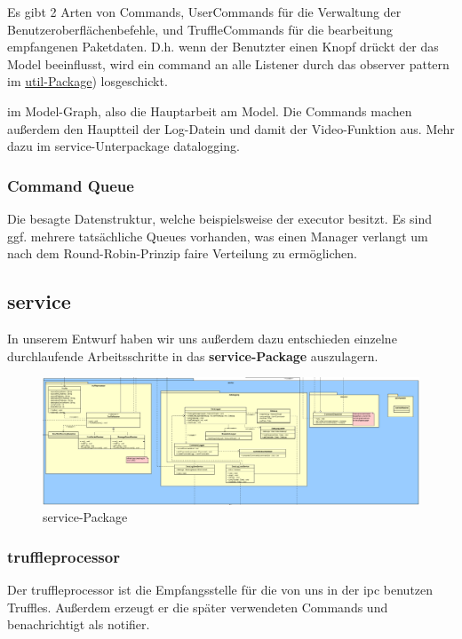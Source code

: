 Es gibt 2 Arten von Commands, UserCommands für die Verwaltung der
Benutzeroberflächenbefehle, und TruffleCommands für die bearbeitung empfangenen
Paketdaten. D.h. wenn der Benutzter einen Knopf drückt der das Model beeinflusst,
wird ein command an alle Listener durch das observer pattern im \hyperref[subsec:util]{util-Package})
losgeschickt.
\newline
\newline

im
Model-Graph, also die Hauptarbeit am Model. Die Commands machen außerdem den
Hauptteil der Log-Datein und damit der Video-Funktion aus. Mehr dazu im
service-Unterpackage datalogging.

    \subsubsection{Command Queue}
    Die besagte Datenstruktur, welche beispielsweise der executor besitzt. Es
    sind ggf. mehrere tatsächliche Queues vorhanden, was einen Manager verlangt
    um nach dem Round-Robin-Prinzip faire Verteilung zu ermöglichen.


\subsection{service}


In unserem Entwurf haben wir uns außerdem dazu entschieden einzelne
durchlaufende Arbeitsschritte in das \textbf{service-Package} auszulagern.\newline

\begin{figure}[H]
  \centering
  \includegraphics[width=\textwidth]{../diagramimages/service.png}
  \caption{service-Package}
  \medskip
\end{figure}

    \subsubsection{truffleprocessor}
    Der truffleprocessor ist die Empfangsstelle für die von uns in der
    \gls{ipc} benutzen Truffles. Außerdem erzeugt er die später verwendeten
    Commands und benachrichtigt als \gls{notifier}.

